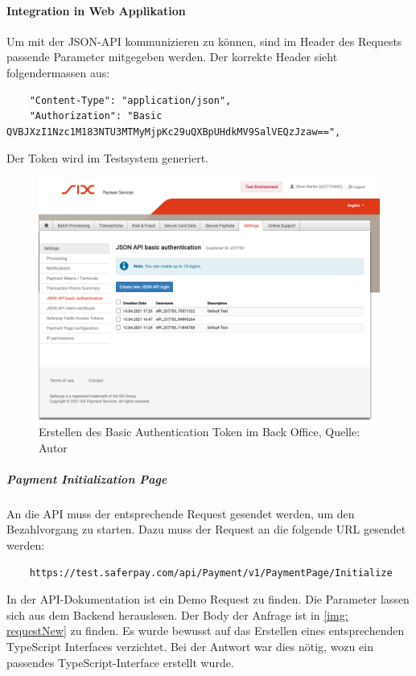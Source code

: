  \paragraph{Integration in Web Applikation}
 Um mit der JSON-API kommunizieren zu können, sind im Header des Requests passende Parameter mitgegeben werden. Der korrekte Header sieht folgendermassen aus: 
 \begin{verbatim}
	"Content-Type": "application/json", 
	"Authorization": "Basic QVBJXzI1Nzc1M183NTU3MTMyMjpKc29uQXBpUHdkMV9SalVEQzJzaw==",
 \end{verbatim}
Der Token wird im Testsystem generiert. 
\begin{figure}[H]
	\centering
	\includegraphics[scale=0.3]{images/basicAuth.PNG}
	\caption[Erstellen des Basic Authentication Token im Back Office]{Erstellen des Basic Authentication Token im Back Office, Quelle: Autor}
	\label{img: basicAuth}
\end{figure} 
 \subparagraph{Payment Initialization Page}
 An die API muss der entsprechende Request gesendet werden, um den Bezahlvorgang zu starten. Dazu muss der Request an die folgende URL gesendet werden: 
 \begin{verbatim}
 	https://test.saferpay.com/api/Payment/v1/PaymentPage/Initialize
 \end{verbatim}
In der API-Dokumentation ist ein Demo Request zu finden. Die Parameter lassen sich aus dem Backend herauslesen. 
Der Body der Anfrage ist in \ref{img: requestNew} zu finden. 
Es wurde bewusst auf das Erstellen eines entsprechenden TypeScript Interfaces verzichtet. Bei der Antwort war dies nötig, wozu ein passendes TypeScript-Interface erstellt wurde.

